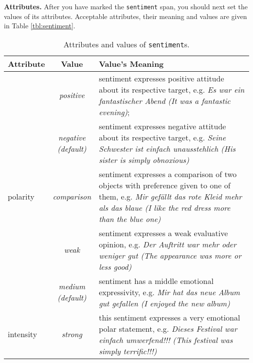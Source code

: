 \documentclass[11pt,a4paper]{article}
\newlength{\clmnwidth}
\theoremstyle{mytheoremstyle}
\begin{document}
\noindent\textbf{Attributes.} After you have marked the
\texttt{sentiment} span, you should next set the values of its
attributes.  Acceptable attributes, their meaning and values are given
in Table \ref{tbl:sentiment}.
\begin{center}
  \begin{table}[ht]
    \caption{Attributes and values of \texttt{sentiment}s.}
    \begin{tabular}{|l|c|p{\clmnwidth}|}\hline
      Attribute & Value & Value's Meaning\\\hline

      & \textit{positive} & sentiment expresses positive attitude about
      its respective target, e.g. \textit{Es war ein fantastischer Abend
        (It was a fantastic evening)};\\\cline{2-3}

      & \textit{negative\newline(default)} & sentiment expresses
      negative attitude about its respective target, e.g. \textit{Seine
        Schwester ist einfach unausstehlich (His sister is simply
        obnoxious)}\\\cline{2-3}

      \multirow{-3}{*}{polarity} & \textit{comparison} & sentiment
      expresses a comparison of two objects with preference given to one
      of them, e.g. \textit{Mir gef\"allt das rote Kleid mehr als das
        blaue (I like the red dress more than the blue one)}\\\hline


      & \textit{weak} & sentiment expresses a weak evaluative opinion,
      e.g. \textit{Der Auftritt war mehr oder weniger gut (The
        appearance was more or less good)}\\\cline{2-3}

      & \textit{medium\newline(default)} & sentiment has a middle
      emotional expressivity, e.g. \textit{Mir hat das neue Album gut
        gefallen (I enjoyed the new album)}\\\cline{2-3}

      \multirow{-3}{*}{intensity} & \textit{strong} & this sentiment
      expresses a very emotional polar statement, e.g. \textit{Dieses
        Festival war einfach umwerfend!!! (This festival was simply
        terrific!!!)}\\\hline


\end{tabular}
\end{table}
\end{center}
\end{document}
